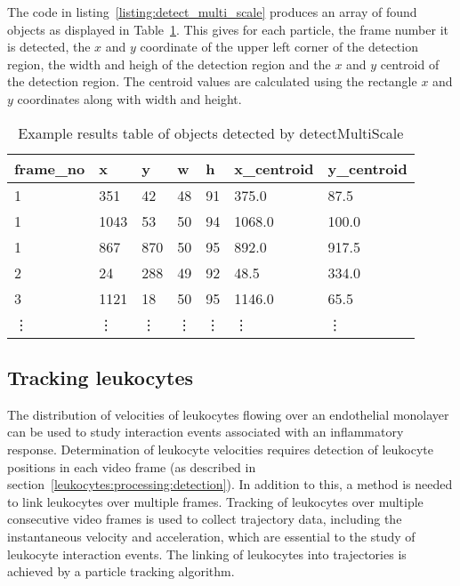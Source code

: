 The code in listing~\ref{listing:detect_multi_scale} produces an array of found objects as displayed in Table~\ref{table:particles_features}. This gives for each particle, the frame number it is detected, the $x$ and $y$ coordinate of the upper left corner of the detection region, the width and heigh of the detection region and the $x$ and $y$ centroid of the detection region. The centroid values are calculated using the rectangle $x$ and $y$ coordinates along with width and height.

\begin{table}[htbp]
\centering
\caption{Example results table of objects detected by detectMultiScale}
\begin{tabular}{lllllll}
\toprule
frame\_no & x      & y      & w      & h      & x\_centroid & y\_centroid \\
\midrule
1         & 351    & 42     & 48     & 91     & 375.0       & 87.5        \\
1         & 1043   & 53     & 50     & 94     & 1068.0      & 100.0       \\
1         & 867    & 870    & 50     & 95     & 892.0       & 917.5       \\
2         & 24     & 288    & 49     & 92     & 48.5        & 334.0       \\
3         & 1121   & 18     & 50     & 95     & 1146.0      & 65.5        \\
\vdots    & \vdots & \vdots & \vdots & \vdots & \vdots      & \vdots      \\
\bottomrule
\end{tabular}
\label{table:particles_features}
\end{table}

\subsection{Tracking leukocytes}
\label{leukocytes:processing:tracking}
The distribution of velocities of leukocytes flowing over an endothelial monolayer can be used to study interaction events associated with an inflammatory response. Determination of leukocyte velocities requires detection of leukocyte positions in each video frame (as described in section~\ref{leukocytes:processing:detection}). In addition to this, a method is needed to link leukocytes over multiple frames. Tracking of leukocytes over multiple consecutive video frames is used to collect trajectory data, including the instantaneous velocity and acceleration, which are essential to the study of leukocyte interaction events. The linking of leukocytes into trajectories is achieved by a particle tracking algorithm.

